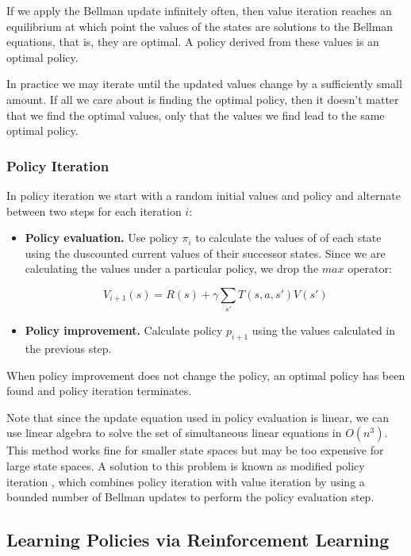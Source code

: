 If we apply the Bellman update infinitely often, then value iteration reaches an equilibrium at which point the values of the states are solutions to the Bellman equations, that is, they are optimal. A policy derived from these values is an optimal policy.

In practice we may iterate until the updated values change by a sufficiently small amount. If all we care about is finding the optimal policy, then it doesn't matter that we find the optimal values, only that the values we find lead to the same optimal policy.

\subsubsection{Policy Iteration}

In policy iteration \cite{howard1960dynamic}we start with a random initial values and policy and alternate between two steps for each iteration $i$:

\begin{itemize}
\item {\bf Policy evaluation.} Use policy $\pi_i$ to calculate the values of of each state using the duscounted current values of their successor states. Since we are calculating the values under a particular policy, we drop the $max$ operator:

  \begin{equation}
  V_{i+1}(s) = R(s) + \gamma \sum_{s'} T(s, a, s') V(s')
  \end{equation}

\item {\bf Policy improvement.} Calculate policy $p_{i+1}$ using the values calculated in the previous step.
\end{itemize}

When policy improvement does not change the policy, an optimal policy has been found and policy iteration terminates.

Note that since the update equation used in policy evaluation is linear, we can use linear algebra to solve the set of simultaneous linear equations in $O(n^3)$. This method works fine for smaller state spaces but may be too expensive for large state spaces. A solution to this problem is known as modified policy iteration \cite{van-nunen1976set,puterman1978modified}, which combines policy iteration with value iteration by using a bounded number of Bellman updates to perform the policy evaluation step.

\subsection{Learning Policies via Reinforcement Learning}\label{sec:rl}

